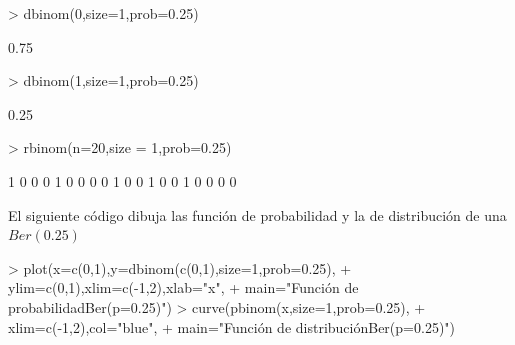 \documentclass[handout]{beamer}
\theoremstyle{plain}
\theoremstyle{definition}
\begin{document}
\begin{frame}[fragile]

\begin{Schunk}
\begin{Sinput}
> dbinom(0,size=1,prob=0.25)
\end{Sinput}
\begin{Soutput}
[1] 0.75
\end{Soutput}
\begin{Sinput}
> dbinom(1,size=1,prob=0.25)
\end{Sinput}
\begin{Soutput}
[1] 0.25
\end{Soutput}
\begin{Sinput}
> rbinom(n=20,size = 1,prob=0.25)
\end{Sinput}
\begin{Soutput}
 [1] 1 0 0 0 1 0 0 0 0 1 0 0 1 0 0 1 0 0 0 0
\end{Soutput}
\end{Schunk}

\end{frame}



\begin{frame}[fragile]

El siguiente código dibuja las función de probabilidad y la de distribución de una  $Ber(0.25)$

\begin{Schunk}
\begin{Sinput}
> plot(x=c(0,1),y=dbinom(c(0,1),size=1,prob=0.25),
+     ylim=c(0,1),xlim=c(-1,2),xlab="x",
+     main="Función de probabilidad\n Ber(p=0.25)")
> curve(pbinom(x,size=1,prob=0.25),
+     xlim=c(-1,2),col="blue",
+     main="Función de distribución\n Ber(p=0.25)")
\end{Sinput}
\end{Schunk}

\end{frame}


\begin{frame}[fragile]


\end{frame}


\begin{frame}[fragile]


\end{frame}
\end{document}
